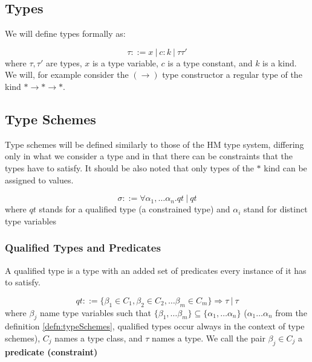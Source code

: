 \subsection{Types}

We will define types formally as:

\begin{defn}[Type]
    $$\tau ::= x\ |\ c : k\ |\ \tau \tau'$$
    where $\tau, \tau'$ are types, $x$ is a type variable, $c$ is a type constant, and $k$ is a kind. We will, for example consider the $(\rightarrow)$ type constructor a regular type of the kind $* \rightarrow * \rightarrow *$.
\end{defn}

\subsection{Type Schemes}

Type schemes will be defined similarly to those of the HM type system, differing only in what we consider a type and in that there can be constraints that the types have to satisfy. It should be also noted that only types of the $*$ kind can be assigned to values.

\begin{defn}
    \label{defn:typeSchemes}
    $$\sigma ::= \forall \alpha_1, \dots \alpha_n . qt\ |\ qt$$
    where $qt$ stands for a qualified type (a constrained type) and $\alpha_i$ stand for distinct type variables
\end{defn}

\subsubsection{Qualified Types and Predicates}

A qualified type is a type with an added set of predicates every instance of it has to satisfy.

\begin{defn}
    $$qt ::= \{\beta_1 \in C_1, \beta_2 \in C_2, \dots \beta_m \in C_m\} \Rightarrow \tau\ |\ \tau$$
    where $\beta_j$ name type variables such that $\{\beta_1, \dots \beta_m\} \subseteq \{\alpha_1, \dots \alpha_n\}$ ($\alpha_1 \dots \alpha_n$ from the definition \ref{defn:typeSchemes}, qualified types occur always in the context of type schemes), $C_j$ names a type class, and $\tau$ names a type. We call the pair $\beta_j \in C_j$ a \textbf{predicate (constraint)}
\end{defn}

